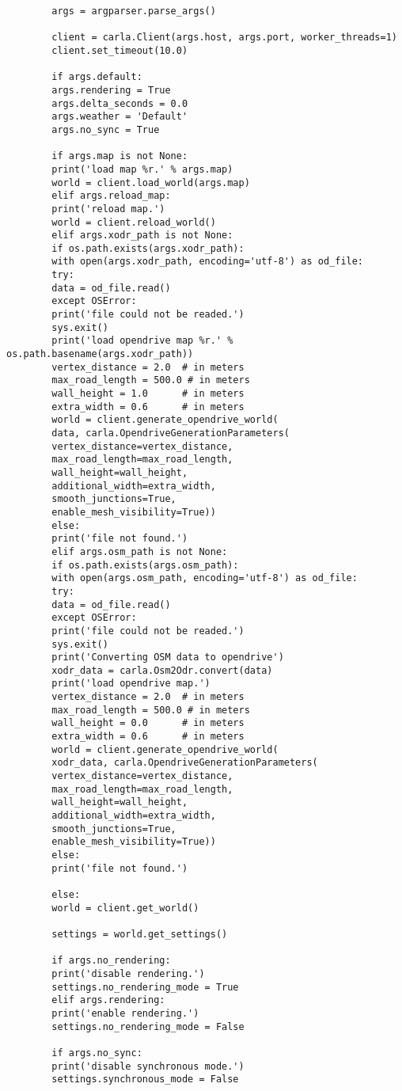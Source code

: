\begin{lstlisting}
		args = argparser.parse_args()
		
		client = carla.Client(args.host, args.port, worker_threads=1)
		client.set_timeout(10.0)
		
		if args.default:
		args.rendering = True
		args.delta_seconds = 0.0
		args.weather = 'Default'
		args.no_sync = True
		
		if args.map is not None:
		print('load map %r.' % args.map)
		world = client.load_world(args.map)
		elif args.reload_map:
		print('reload map.')
		world = client.reload_world()
		elif args.xodr_path is not None:
		if os.path.exists(args.xodr_path):
		with open(args.xodr_path, encoding='utf-8') as od_file:
		try:
		data = od_file.read()
		except OSError:
		print('file could not be readed.')
		sys.exit()
		print('load opendrive map %r.' % os.path.basename(args.xodr_path))
		vertex_distance = 2.0  # in meters
		max_road_length = 500.0 # in meters
		wall_height = 1.0      # in meters
		extra_width = 0.6      # in meters
		world = client.generate_opendrive_world(
		data, carla.OpendriveGenerationParameters(
		vertex_distance=vertex_distance,
		max_road_length=max_road_length,
		wall_height=wall_height,
		additional_width=extra_width,
		smooth_junctions=True,
		enable_mesh_visibility=True))
		else:
		print('file not found.')
		elif args.osm_path is not None:
		if os.path.exists(args.osm_path):
		with open(args.osm_path, encoding='utf-8') as od_file:
		try:
		data = od_file.read()
		except OSError:
		print('file could not be readed.')
		sys.exit()
		print('Converting OSM data to opendrive')
		xodr_data = carla.Osm2Odr.convert(data)
		print('load opendrive map.')
		vertex_distance = 2.0  # in meters
		max_road_length = 500.0 # in meters
		wall_height = 0.0      # in meters
		extra_width = 0.6      # in meters
		world = client.generate_opendrive_world(
		xodr_data, carla.OpendriveGenerationParameters(
		vertex_distance=vertex_distance,
		max_road_length=max_road_length,
		wall_height=wall_height,
		additional_width=extra_width,
		smooth_junctions=True,
		enable_mesh_visibility=True))
		else:
		print('file not found.')
		
		else:
		world = client.get_world()
		
		settings = world.get_settings()
		
		if args.no_rendering:
		print('disable rendering.')
		settings.no_rendering_mode = True
		elif args.rendering:
		print('enable rendering.')
		settings.no_rendering_mode = False
		
		if args.no_sync:
		print('disable synchronous mode.')
		settings.synchronous_mode = False
		

\end{lstlisting}
